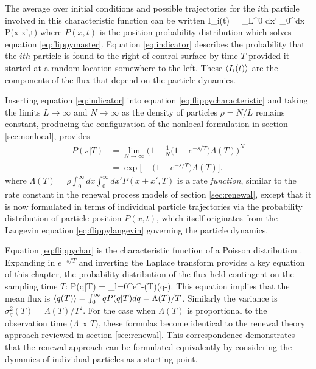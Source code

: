 The average over initial conditions and possible trajectories for the $i$th particle involved in this characteristic function can be written
\be \bra I_i(t) \ket = \int_L^0 dx' \int_0^\infty dx P(x-x',t) \label{eq:indicator} \ee
where $P(x,t)$ is the position probability distribution which solves equation \ref{eq:flippymaster}.
Equation \ref{eq:indicator} describes the probability that the $ith$ particle is found to the right of control surface by time $T$ provided it started at a random location somewhere to the left.
These $\langle I_i(t) \rangle$ are the components of the flux that depend on the particle dynamics. 

Inserting equation \ref{eq:indicator} into equation \ref{eq:flippycharacteristic} and taking the limits $L\rightarrow \infty$ and $N \rightarrow \infty$ as the density of particles $\rho = N/L$ remains constant, producing the configuration of the nonlocal formulation in section \ref{sec:nonlocal}, provides
\begin{align} \tilde{P}(s|T) &= \lim_{N \rightarrow \infty} \Big(1 - \frac{1}{N}\big(1-e^{-s/T}\big)\Lambda(T) \Big)^N \\ &= \exp \Big[ -\big(1-e^{-s/T}\big)\Lambda(T) \Big]. \label{eq:flippychar} \end{align}
where $\Lambda(T) = \rho \int_0^\infty dx \int_0^\infty dx' P(x+x',T)$ is a rate \textit{function}, similar to the rate constant in the renewal process models of section \ref{sec:renewal}, except that it is now formulated in terms of individual particle trajectories via the probability distribution of particle position $P(x,t)$, which itself originates from the Langevin equation \ref{eq:flippylangevin} governing the particle dynamics.

Equation \ref{eq:flippychar} is the characteristic function of a Poisson distribution \citep{Cox1965}.
Expanding in $e^{-s/T}$ and inverting the Laplace transform provides a key equation of this chapter, the probability distribution of the flux held contingent on the sampling time $T$:
\be P(q|T) = \sum_{l=0}^\infty {}e^{-\Lambda(T)}\delta(q-). \label{eq:flippydist}\ee
This equation implies that the mean flux is $\langle q(T) \rangle = \int_0^\infty q P(q|T) dq = \Lambda(T)/T$. Similarly the variance is $\sigma_q^2(T) = \Lambda(T)/T^2$. For the case when $\Lambda(T)$ is proportional to the observation time ($\Lambda \propto T$), these formulas become identical to the renewal theory approach reviewed in section \ref{sec:renewal}.
This correspondence demonstrates that the renewal approach can be formulated equivalently by considering the dynamics of individual particles as a starting point.

